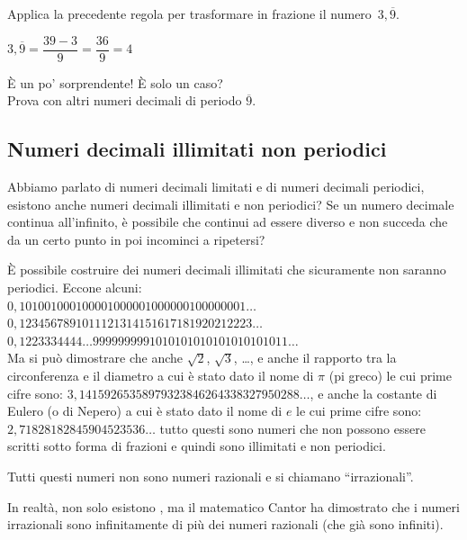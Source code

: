 \begin{osservazione}{}{}
Applica la precedente regola per trasformare in frazione il 
numero~\(3,\overline{9}\). 

\(3,\overline{9} = \dfrac{39 - 3}{9} = \dfrac{36}{9} = 4\)
\end{osservazione}

\noindent È un po' sorprendente! È solo un caso?\\
Prova con altri numeri decimali di periodo \(\overline{9}\).

\subsection{Numeri decimali illimitati non periodici}

Abbiamo parlato di numeri decimali limitati e di numeri decimali 
periodici, esistono anche numeri decimali illimitati e non periodici?
Se un numero decimale continua all'infinito, è possibile che continui ad 
essere diverso e non succeda che da un certo punto in poi incominci a 
ripetersi?

È possibile costruire dei numeri decimali illimitati che sicuramente non 
saranno periodici. Eccone alcuni:\\
\(0,101001000100001000001000000100000001\dots\)\\
\(0,1234567891011121314151617181920212223\dots\)\\
\(0,1223334444\dots9999999991010101010101010101011\dots\)\\
Ma si può dimostrare che anche \(\sqrt{2}\), \(\sqrt{3}\), \dots, 
e anche il rapporto tra la circonferenza e il diametro a cui è stato dato 
il nome di \(\pi\) (pi greco) le cui prime cifre sono: 
\(3,14159265358979323846264338327950288\!\dots\), 
e anche la costante di Eulero (o di Nepero) a cui è stato dato il nome di 
\(e\) le cui prime cifre sono:
\(2,71828182845904523536\!\dots\)
tutto questi sono 
numeri che non possono essere scritti sotto forma di frazioni e quindi 
sono illimitati e non periodici.

Tutti questi numeri non sono numeri razionali e si chiamano 
``irrazionali''.

\begin{osservazione}{}{}
In realtà, non solo esistono , ma il matematico Cantor 
ha dimostrato che i numeri irrazionali sono infinitamente di più dei numeri 
razionali (che già sono infiniti).
\end{osservazione}

